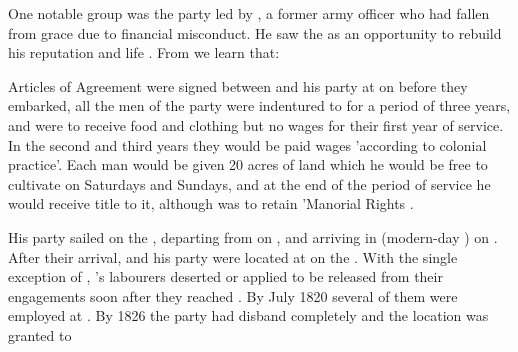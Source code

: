One notable group was the party led by \biggarAFullNames{}, a former army officer who had fallen from grace due to financial misconduct. He saw the \capeColony{} as an opportunity to rebuild his reputation and life \autocite[45]{nash:1820}. From  we learn that:
\begin{displayquote}
    Articles of Agreement were signed between \biggarASurname{} and his party at \portsmouth{} on  before they embarked, all the men of the party were indentured to \biggarASurname{} for a period of three years, and were to receive food and clothing but no wages for their first year of service. In the second and third years they would be paid wages 'according to colonial practice'. Each man would be given 20 acres of land which he would be free to cultivate on Saturdays and Sundays, and at the end of the period of service he would receive title to it, although \biggarASurname{} was to retain 'Manorial Rights \autocite[45]{nash:1820}.
\end{displayquote}

His party sailed on the \weymouth{}, departing from \portsmouth{} on , and arriving in \algoaBay{} (modern-day \portElizabeth{}) on  \autocite[45]{nash:1820}. After their arrival, \biggarASurname{} and his party were located at \drieFontein{} on the \brakRivier{}. With the single exception of \pollardGName{}, \biggarASurname{}'s labourers deserted or applied to be released from their engagements soon after they reached \albany{}. By July 1820 several of them were employed at \somersetFarm{}. By 1826 the party had disband completely and the location was granted to \biggarAFullNames{} \autocite[37]{tanner:2019}